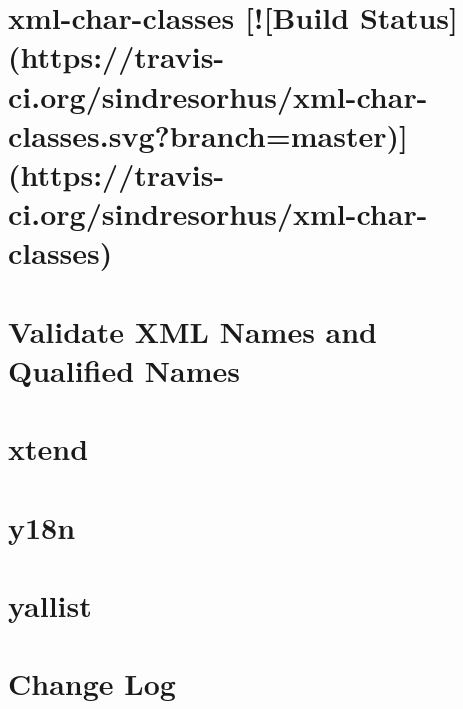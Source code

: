\documentclass[twoside]{book}
\newcommand{\+}{\discretionary{\mbox{\scriptsize$\hookleftarrow$}}{}{}}
\begin{document}
\chapter{xml-\/char-\/classes \mbox{[}!\mbox{[}Build Status\mbox{]}(https\+://travis-\/ci.org/sindresorhus/xml-\/char-\/classes.svg?branch=master)\mbox{]}(https\+://travis-\/ci.org/sindresorhus/xml-\/char-\/classes)}
\label{md__c_1_workspace_demo_src_main_script_node_modules_xml-char-classes_readme}

\chapter{Validate X\+ML Names and Qualified Names}
\label{md__c_1_workspace_demo_src_main_script_node_modules_xml-name-validator__r_e_a_d_m_e}

\chapter{xtend}
\label{md__c_1_workspace_demo_src_main_script_node_modules_xtend__r_e_a_d_m_e}

\chapter{y18n}
\label{md__c_1_workspace_demo_src_main_script_node_modules_y18n__r_e_a_d_m_e}

\chapter{yallist}
\label{md__c_1_workspace_demo_src_main_script_node_modules_yallist__r_e_a_d_m_e}

\chapter{Change Log}
\label{md__c_1_workspace_demo_src_main_script_node_modules_yargs__c_h_a_n_g_e_l_o_g}

\end{document}
